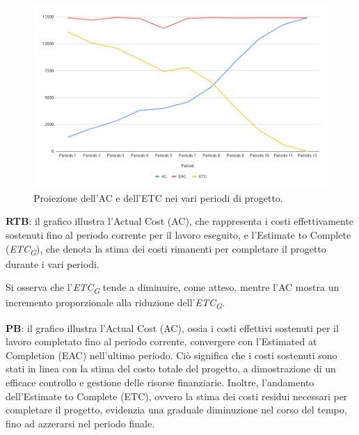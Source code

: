\vspace{0.3cm}

\begin{figure}[H]
    \centering
    \includegraphics[width=1\textwidth]{../Images/PianoDiQualifica/AC_ETC.png}
    \caption{Proiezione dell’AC e dell’ETC nei vari periodi di progetto.}
    \label{fig:4}
\end{figure}

\vspace{0.2cm}

\textbf{RTB}: il grafico illustra l'Actual Cost (AC), che rappresenta i costi effettivamente sostenuti fino al periodo corrente per il lavoro eseguito, e l'Estimate to Complete (\textit{ETC}\textsubscript{\textit{G}}), che denota la stima dei costi rimanenti per completare il progetto durante i vari periodi.

\vspace{0.2cm}

Si osserva che l'\textit{ETC}\textsubscript{\textit{G}} tende a diminuire, come atteso, mentre l'AC mostra un incremento proporzionale alla riduzione dell'\textit{ETC}\textsubscript{\textit{G}}.

\vspace{0.2cm}
\textbf{PB}: il grafico illustra l'Actual Cost (AC), ossia i costi effettivi sostenuti per il lavoro completato fino al periodo corrente, convergere con l'Estimated at Completion (EAC) nell'ultimo periodo.
Ciò significa che i costi sostenuti sono stati in linea con la stima del costo totale del progetto, a dimostrazione di un efficace controllo e gestione delle risorse finanziarie. Inoltre, l'andamento dell'Estimate to Complete (ETC), ovvero la stima dei costi residui necessari per completare il progetto, evidenzia una graduale diminuzione nel corso del tempo, fino ad azzerarsi nel periodo finale.

